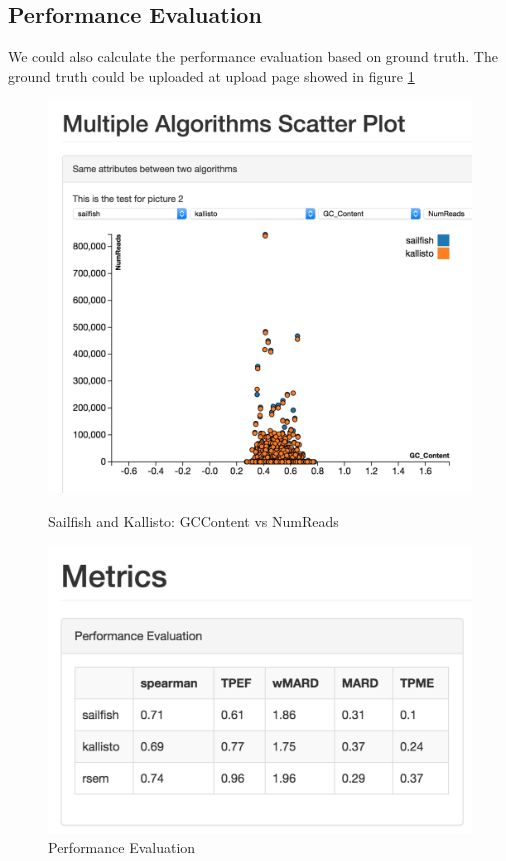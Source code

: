 \documentclass[11pt,letter]{article}
\begin{document}
\subsection {Performance Evaluation}
We could also calculate the performance evaluation based on ground truth. The ground truth could be uploaded at upload page showed in figure \ref{fig:metrics}

\begin{figure}[ht]
\centering
\begin{minipage}[b]{0.47\linewidth}
\includegraphics[width=1.0\textwidth]{./fig/two_algo.jpg}
\caption{Sailfish and Kallisto:  GCContent vs  NumReads }
\label{fig:two_algo}
\end{minipage}
\quad
\begin{minipage}[b]{0.47\linewidth}
\includegraphics[width=1.0\textwidth]{./fig/metrics.jpg}
  \caption{Performance Evaluation  }
  \label{fig:metrics}
\end{minipage}
\end{figure}
\end{document}
